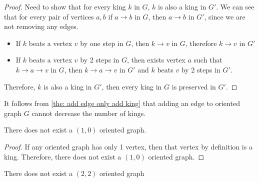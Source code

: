 \begin{proof}
  Need to show that for every king \(k\) in \(G\),
  \(k\) is also a king in \(G'\).
  We can see that for every pair of vertices \(a, b\)
  if \(a \to b\) in \(G\), then \(a \to b\) in \(G'\),
  since we are not removing any edges.

  \begin{itemize}
    \item
      If \(k\) beats a vertex \(v\) by one step in \(G\),
      then \(k \to v\) in \(G\),
      therefore \(k \to v\) in \(G'\)
    \item
      If \(k\) beats a vertex \(v\) by 2 steps in \(G\),
      then exists vertex \(a\) such that
      \(k \to a \to v\) in \(G\), then \(k \to a \to v\) in \(G'\)
      and \(k\) beats \(v\) by 2 steps in \(G'\).
  \end{itemize}

  Therefore, \(k\) is also a king in \(G'\),
  then every king in \(G\) is preserved in \(G'\).
\end{proof}

It follows from \cref{the: add edge only add king}
that adding an edge to oriented graph \(G\)
cannot decrease the number of kings.

\begin{lemma}\label{the: no (1 0) oriented graph}
  There does not exist a \((1, 0)\) oriented graph.
\end{lemma}
\begin{proof}
  If any oriented graph has only 1 vertex,
  then that vertex by definition is a king.
  Therefore, there does not exist a \((1, 0)\) oriented graph.
\end{proof}

\begin{lemma}\label{the: no (2 2) oriented graph}
  There does not exist a \((2, 2)\) oriented graph
\end{lemma}

